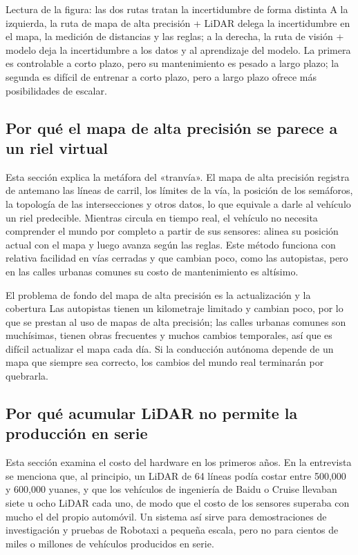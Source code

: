 \documentclass[a4paper]{article}
\begin{document}
\begin{knowledgebox}{Lectura de la figura: las dos rutas tratan la incertidumbre de forma distinta}
A la izquierda, la ruta de mapa de alta precisión + LiDAR delega la incertidumbre en el mapa, la medición de distancias y las reglas; a la derecha, la ruta de visión + modelo deja la incertidumbre a los datos y al aprendizaje del modelo. La primera es controlable a corto plazo, pero su mantenimiento es pesado a largo plazo; la segunda es difícil de entrenar a corto plazo, pero a largo plazo ofrece más posibilidades de escalar.
\end{knowledgebox}

\subsection{Por qué el mapa de alta precisión se parece a un riel virtual}

Esta sección explica la metáfora del «tranvía». El mapa de alta precisión registra de antemano las líneas de carril, los límites de la vía, la posición de los semáforos, la topología de las intersecciones y otros datos, lo que equivale a darle al vehículo un riel predecible. Mientras circula en tiempo real, el vehículo no necesita comprender el mundo por completo a partir de sus sensores: alinea su posición actual con el mapa y luego avanza según las reglas. Este método funciona con relativa facilidad en vías cerradas y que cambian poco, como las autopistas, pero en las calles urbanas comunes su costo de mantenimiento es altísimo.

\begin{warningbox}{El problema de fondo del mapa de alta precisión es la actualización y la cobertura}
Las autopistas tienen un kilometraje limitado y cambian poco, por lo que se prestan al uso de mapas de alta precisión; las calles urbanas comunes son muchísimas, tienen obras frecuentes y muchos cambios temporales, así que es difícil actualizar el mapa cada día. Si la conducción autónoma depende de un mapa que siempre sea correcto, los cambios del mundo real terminarán por quebrarla.
\end{warningbox}

\subsection{Por qué acumular LiDAR no permite la producción en serie}

Esta sección examina el costo del hardware en los primeros años. En la entrevista se menciona que, al principio, un LiDAR de 64 líneas podía costar entre 500,000 y 600,000 yuanes, y que los vehículos de ingeniería de Baidu o Cruise llevaban siete u ocho LiDAR cada uno, de modo que el costo de los sensores superaba con mucho el del propio automóvil. Un sistema así sirve para demostraciones de investigación y pruebas de Robotaxi a pequeña escala, pero no para cientos de miles o millones de vehículos producidos en serie.
\end{document}
